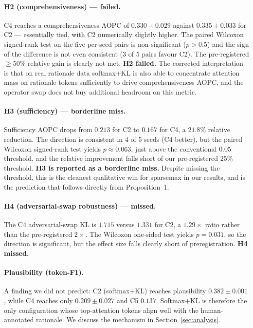\documentclass{article}
\begin{document}
\paragraph{H2 (comprehensiveness) --- failed.} C4 reaches a comprehensiveness AOPC of
$0.330 \pm 0.029$ against $0.335 \pm 0.033$ for C2 --- essentially tied, with C2
numerically slightly higher. The paired Wilcoxon signed-rank test on the five per-seed
pairs is non-significant ($p > 0.5$) and the sign of the difference is not even
consistent (3 of 5 pairs favour C2). The pre-registered $\geq 50\%$ relative gain is
clearly not met. \textbf{H2 failed.} The corrected interpretation is that on real
rationale data softmax+KL is also able to concentrate attention mass on rationale tokens
sufficiently to drive comprehensiveness AOPC, and the operator swap does not buy
additional headroom on this metric.

\paragraph{H3 (sufficiency) --- borderline miss.} Sufficiency AOPC drops from $0.213$
for C2 to $0.167$ for C4, a $21.8\%$ relative reduction. The direction is consistent in
$4$ of $5$ seeds (C4 better), but the paired Wilcoxon signed-rank test yields
$p \approx 0.063$, just above the conventional $0.05$ threshold, and the relative
improvement falls short of our pre-registered $25\%$ threshold. \textbf{H3 is reported
as a borderline miss.} Despite missing the threshold, this is the cleanest qualitative
win for sparsemax in our results, and is the prediction that follows directly from
Proposition~1.

\paragraph{H4 (adversarial-swap robustness) --- missed.} The C4 adversarial-swap KL is
$1.715$ versus $1.331$ for C2, a $1.29{\times}$ ratio rather than the pre-registered
$2{\times}$. The Wilcoxon one-sided test yields $p{=}0.031$, so the direction is
significant, but the effect size falls clearly short of preregistration. \textbf{H4
missed.}

\paragraph{Plausibility (token-F1).} A finding we did not predict: C2 (softmax+KL)
reaches plausibility $0.382 \pm 0.001$, while C4 reaches only $0.209 \pm 0.027$ and C5
$0.137$. Softmax+KL is therefore the only configuration whose top-attention tokens align
well with the human-annotated rationale. We discuss the mechanism in
Section~\ref{sec:analysis}.
\end{document}
